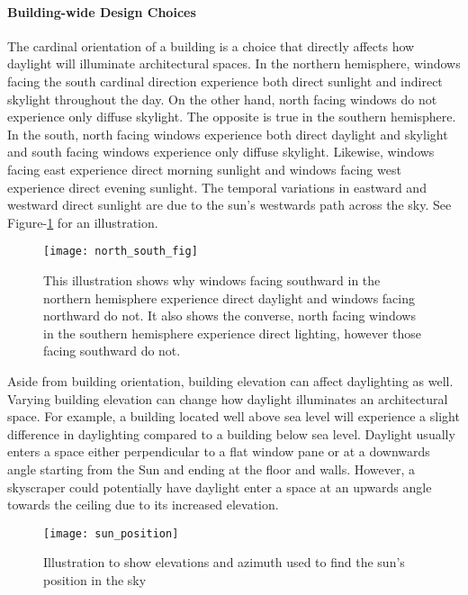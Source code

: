     \paragraph{Building-wide Design Choices} 
    The cardinal orientation of a building is a choice that directly affects how daylight will illuminate architectural spaces. In the northern hemisphere, windows facing the south cardinal direction experience both direct sunlight and indirect skylight throughout the day. On the other hand, north facing windows do not experience only diffuse skylight. The opposite is true in the southern hemisphere. In the south, north facing windows experience both direct daylight and skylight and south facing windows experience only diffuse skylight. Likewise, windows facing east experience direct morning sunlight and windows facing west experience direct evening sunlight. The temporal variations in eastward and westward direct sunlight are due to the sun's westwards path across the sky\cite{Robbins}. See Figure-\ref{fig:north_south} for an illustration.

    \begin{figure}[h]
      \centering
      \texttt{[image: north\_south\_fig]}
      \caption{This illustration shows why windows facing southward in the northern hemisphere experience direct daylight and windows facing northward do not. It also shows the converse, north facing windows in the southern hemisphere experience direct lighting, however those facing southward do not.} 
      \label{fig:north_south}
    \end{figure}

    Aside from building orientation, building elevation can affect daylighting as well. Varying building elevation can change how daylight illuminates an architectural space. For example, a building located well above sea level will experience a slight difference in daylighting compared to a building below sea level. Daylight usually enters a space either perpendicular to a flat window pane or at a downwards angle starting from the Sun and ending at the floor and walls. However, a skyscraper could potentially have daylight enter a space at an upwards angle towards the ceiling due to its increased elevation.\\

    \begin{figure}[h]
      \centering
      \texttt{[image: sun\_position]}
      \caption{Illustration to show elevations and azimuth used to find the sun's position in the sky} 
      \label{fig:sun_position}
    \end{figure}

